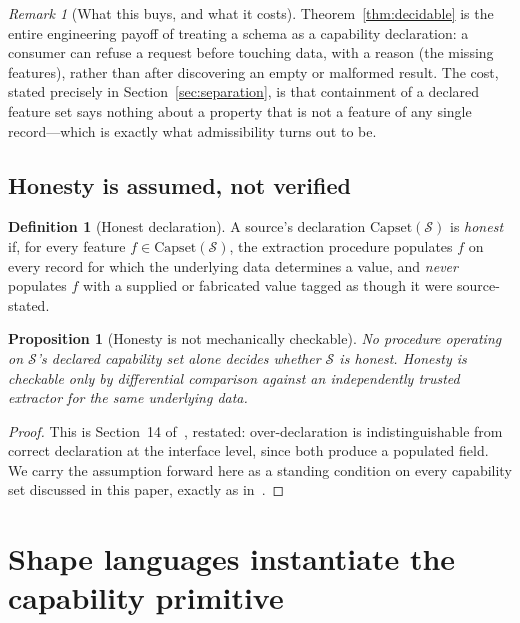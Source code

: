 \documentclass[11pt,a4paper,twocolumn]{article}
\newtheorem{proposition}[theorem]{Proposition}
\theoremstyle{definition}
\newtheorem{definition}[theorem]{Definition}
\theoremstyle{remark}
\newtheorem{remark}[theorem]{Remark}
\newcommand{\Capset}{\mathrm{Capset}}
\newcommand{\Src}{\mathcal{S}}
\begin{document}
\begin{remark}[What this buys, and what it costs]
Theorem~\ref{thm:decidable} is the entire engineering payoff of treating a
schema as a capability declaration: a consumer can refuse a request before
touching data, with a reason (the missing features), rather than after
discovering an empty or malformed result. The cost, stated precisely in
Section~\ref{sec:separation}, is that containment of a declared feature set says
nothing about a property that is not a feature of any single record---which is
exactly what admissibility turns out to be.
\end{remark}

\subsection{Honesty is assumed, not verified}

\begin{definition}[Honest declaration]
\label{def:honest}
A source's declaration $\Capset(\Src)$ is \emph{honest} if, for every feature
$f\in\Capset(\Src)$, the extraction procedure populates $f$ on every record for
which the underlying data determines a value, and \emph{never} populates $f$ with
a supplied or fabricated value tagged as though it were source-stated.
\end{definition}

\begin{proposition}[Honesty is not mechanically checkable]
\label{prop:honesty-unverifiable}
No procedure operating on $\Src$'s declared capability set alone decides whether
$\Src$ is honest. Honesty is checkable only by differential comparison against an
independently trusted extractor for the same underlying data.
\end{proposition}

\begin{proof}
This is Section~14 of~\cite{masamune}, restated: over-declaration is
indistinguishable from correct declaration at the interface level, since both
produce a populated field. We carry the assumption forward here as a standing
condition on every capability set discussed in this paper, exactly as
in~\cite{masamune}.
\end{proof}

\section{Shape languages instantiate the capability primitive}
\label{sec:linkml}
\end{document}
